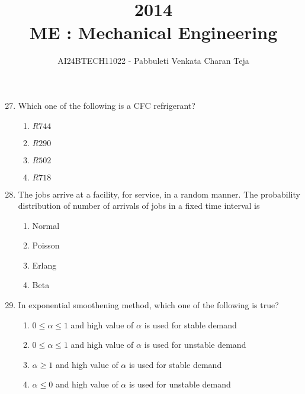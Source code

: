 \documentclass[journal]{IEEEtran}
\begin{document}

\vspace{3cm}

\title{2014\\ME : Mechanical Engineering}
\author{AI24BTECH11022 - Pabbuleti Venkata Charan Teja}
\maketitle

\renewcommand{\thefigure}{\theenumi}
\renewcommand{\thetable}{\theenumi}


\begin{enumerate}
\setcounter{enumi}{26}
\item Which one of the following is a CFC refrigerant?
\begin{multicols}{2}
\begin{enumerate}
\item $R744$
\item $R290$
\item $R502$
\item $R718$
\end{enumerate}
\end{multicols}


\item The jobs arrive at a facility, for service, in a random manner. The probability distribution of number of arrivals of jobs in a fixed time interval is
\begin{multicols}{2}
\begin{enumerate}
\item Normal
\item Poisson
\item Erlang
\item Beta
\end{enumerate}
\end{multicols}


\item In exponential smoothening method, which one of the following is true?
\begin{enumerate}
\item $0\leq\alpha\leq1$ and high value of $\alpha$ is used for stable demand
\item $0\leq\alpha\leq1$ and high value of $\alpha$ is used for unstable demand
\item $\alpha\geq 1$ and high value of $\alpha$ is used for stable demand
\item $\alpha\leq 0$ and high value of $\alpha$ is used for unstable demand
\end{enumerate}



\end{enumerate}
\end{document}
